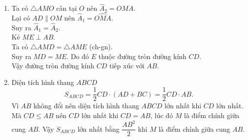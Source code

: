 \begin{vd}
{\begin{enumerate}
\begin{center}
$AD+BC=2MO=AB$ (không đổi).
\end{center}
\item Ta có $\triangle AMO$ cân tại $O$ nên $\widehat{A}_2=\widehat{OMA}$.\\
Lại có $AD \parallel OM$ nên $\widehat{A}_1=\widehat{OMA}$.\\
Suy ra $\widehat{A}_1=\widehat{A}_2$.\\
Kẻ $ME\perp AB$.\\
Ta có $\triangle AMD=\triangle AME$ (ch-gn).\\
Suy ra $MD=ME$. Do đó $E$ thuộc đường tròn đường kính $CD$.\\
Vậy đường tròn đường kính $CD$ tiếp xúc với $AB$.
\item Diện tích hình thang $ABCD$
$$S_{ABCD}=\dfrac{1}{2}CD \cdot (AD+BC)=\dfrac{1}{2}CD\cdot AB.$$
Vì $AB$ không đổi nên diện tích hình thang $ABCD$ lớn nhất khi $CD$ lớn nhất.\\
Mà $CD \le AB$ nên $CD$ lớn nhất khi $CD=AB$, lúc đó $M$ là điểm chính giữa cung $AB$.
Vậy $S_{ABCD}$ lớn nhất bằng $\dfrac{AB^2}{2}$ khi $M$ là điểm chính giữa cung $AB$.
\end{enumerate}
}
\end{vd}

